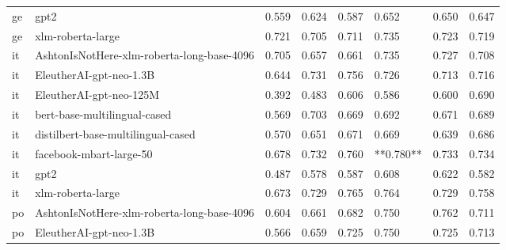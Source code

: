 \begin{tabular}{llllllll}
      ge &                                       gpt2 & 0.559 &                     0.624 &                 0.587 &                  0.652 &                                   0.650 &    0.647 \\
      ge &                          xlm-roberta-large & 0.721 &                     0.705 &                 0.711 &                  0.735 &                                   0.723 &    0.719 \\
      it & AshtonIsNotHere-xlm-roberta-long-base-4096 & 0.705 &                     0.657 &                 0.661 &                  0.735 &                                   0.727 &    0.708 \\
      it &                    EleutherAI-gpt-neo-1.3B & 0.644 &                     0.731 &                 0.756 &                  0.726 &                                   0.713 &    0.716 \\
      it &                    EleutherAI-gpt-neo-125M & 0.392 &                     0.483 &                 0.606 &                  0.586 &                                   0.600 &    0.690 \\
      it &               bert-base-multilingual-cased & 0.569 &                     0.703 &                 0.669 &                  0.692 &                                   0.671 &    0.689 \\
      it &         distilbert-base-multilingual-cased & 0.570 &                     0.651 &                 0.671 &                  0.669 &                                   0.639 &    0.686 \\
      it &                    facebook-mbart-large-50 & 0.678 &                     0.732 &                 0.760 &              **0.780** &                                   0.733 &    0.734 \\
      it &                                       gpt2 & 0.487 &                     0.578 &                 0.587 &                  0.608 &                                   0.622 &    0.582 \\
      it &                          xlm-roberta-large & 0.673 &                     0.729 &                 0.765 &                  0.764 &                                   0.729 &    0.758 \\
      po & AshtonIsNotHere-xlm-roberta-long-base-4096 & 0.604 &                     0.661 &                 0.682 &                  0.750 &                                   0.762 &    0.711 \\
      po &                    EleutherAI-gpt-neo-1.3B & 0.566 &                     0.659 &                 0.725 &                  0.750 &                                   0.725 &    0.713 \\

\end{tabular}
